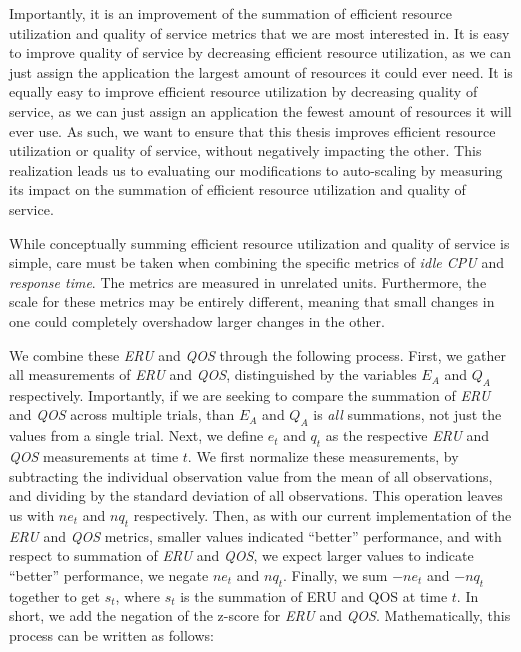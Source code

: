 Importantly, it is an improvement of the summation of efficient resource
utilization and quality of service metrics that we are most interested in. It is
easy to improve quality of service by decreasing efficient resource
utilization, as we can just assign the application the largest amount of
resources it could ever need. It is equally easy to improve efficient resource
utilization by decreasing quality of service, as we can just assign an
application the fewest amount of resources it will ever use. As such, we want to
ensure that this thesis improves efficient resource utilization or quality of
service, without negatively impacting the other. This realization leads us to
evaluating our modifications to auto-scaling by measuring its impact on the
summation of efficient resource utilization and quality of service.

While conceptually summing efficient resource utilization and quality of service
is simple, care must be taken when combining the specific metrics of
\textit{idle CPU} and \textit{response time}. The metrics are measured in unrelated
units. Furthermore, the scale for these metrics may be entirely different,
meaning that small changes in one could completely overshadow larger changes in
the other.

We combine these \textit{ERU} and \textit{QOS} through the following process.
First, we gather all measurements of \textit{ERU} and \textit{QOS},
distinguished by the variables $E_{A}$ and $Q_{A}$ respectively. Importantly,
if we are seeking to compare the summation of \textit{ERU} and \textit{QOS}
across multiple trials, than $E_{A}$ and $Q_{A}$ is \textit{all} summations, not
just the values from a single trial. Next, we define $e_{t}$ and $q_{t}$ as the
respective \textit{ERU} and \textit{QOS} measurements at time $t$. We first
normalize these measurements, by subtracting the individual observation value
from the mean of all observations, and dividing by the standard deviation of all
observations. This operation leaves us with $ne_{t}$ and $nq_{t}$ respectively.
Then, as with our current implementation of the \textit{ERU} and \textit{QOS}
metrics, smaller values indicated ``better'' performance, and with respect to
summation of \textit{ERU} and \textit{QOS}, we expect larger values to indicate
``better'' performance, we negate $ne_{t}$ and $nq_{t}$. Finally, we sum
$-ne_{t}$ and $-nq_{t}$ together to get $s_{t}$, where $s_{t}$ is the summation
of ERU and QOS at time $t$. In short, we add the negation of the z-score for
\textit{ERU} and \textit{QOS}. Mathematically, this process can be written as
follows:

